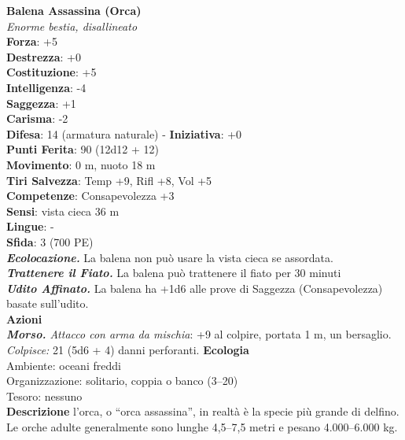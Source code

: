 \begin{multicols}{2}
\medskip\textbf{Balena Assassina (Orca)}\\
\emph{Enorme bestia, disallineato}\\
\textbf{Forza}: +5\\
\textbf{Destrezza}: +0\\
\textbf{Costituzione}: +5\\
\textbf{Intelligenza}: -4\\
\textbf{Saggezza}: +1\\
\textbf{Carisma}: -2\\
\textbf{Difesa}: 14 (armatura naturale) - \textbf{Iniziativa}: +0\\
\textbf{Punti Ferita}: 90 (12d12 + 12)\\
\textbf{Movimento}: 0 m, nuoto 18 m\\
\textbf{Tiri Salvezza}: Temp +9, Rifl +8, Vol +5\\
\textbf{Competenze}: Consapevolezza +3\\
\textbf{Sensi}: vista cieca 36 m\\
\textbf{Lingue}: -\\
\textbf{Sfida}: 3 (700 PE)\smallskip\\
\emph{\textbf{Ecolocazione.}} La balena non può usare la vista cieca se assordata.\\
\emph{\textbf{Trattenere il Fiato.}} La balena può trattenere il fiato per 30 minuti\\
\emph{\textbf{Udito Affinato.}} La balena ha +1d6 alle prove di Saggezza (Consapevolezza) basate sull'udito.\\
\smallskip\textbf{Azioni}\\
\emph{\textbf{Morso.} Attacco con arma da mischia}: +9 al colpire, portata 1 m, un bersaglio.\\
\emph{Colpisce:} 21 (5d6 + 4) danni perforanti.
\textbf{Ecologia}\\
Ambiente: oceani freddi\\
Organizzazione: solitario, coppia o banco (3–20)\\
Tesoro: nessuno\\
\textbf{Descrizione}
l'orca, o “orca assassina”, in realtà è la specie più grande di delfino. Le orche adulte generalmente sono lunghe 4,5–7,5 metri e pesano 4.000–6.000 kg.\\


\end{multicols}
